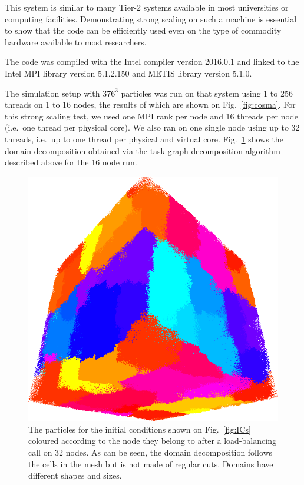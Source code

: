 \documentclass{sig-alternate-05-2015}
\begin{document}
This system is similar to many Tier-2 systems available in most universities or
computing facilities. Demonstrating strong scaling on such a machine is
essential to show that the code can be efficiently used even on the type of
commodity hardware available to most researchers.

The code was compiled with the Intel compiler version \textsc{2016.0.1} and
linked to the Intel MPI library version \textsc{5.1.2.150} and METIS library
version \textsc{5.1.0}.

The simulation setup with $376^3$ particles was run on that system using 1 to
256 threads on 1 to 16 nodes, the results of which are shown on
Fig.~\ref{fig:cosma}. For this strong scaling test, we used one MPI rank per node and 16
threads per node (i.e.~one thread per physical core). We also ran on one single
node using up to 32 threads, i.e.~up to one thread per physical and
virtual core. Fig.~\ref{fig:domains} shows the domain decomposition
obtained via the task-graph decomposition algorithm described above for
the 16 node run.

\begin{figure}
\centering
\includegraphics[width=\columnwidth]{Figures/domains}
\caption{The particles for the initial conditions shown on Fig.~\ref{fig:ICs}
  coloured according to the node they belong to after a load-balancing call on
  32 nodes. As can be seen, the domain decomposition follows the cells in the mesh
  but is not made of regular cuts. Domains have different shapes and
  sizes. \label{fig:domains}}
\end{figure}  
\end{document}
